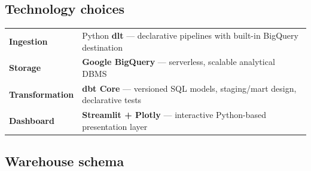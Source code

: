 \documentclass[11pt,a4paper]{article}
\begin{document}
\subsection{Technology choices}

\begin{tcolorbox}[infobox]
\renewcommand{\arraystretch}{1.25}
\begin{tabularx}{\textwidth}{@{}lX@{}}
  \textbf{Ingestion}      & Python \textbf{dlt} --- declarative pipelines with built-in BigQuery destination \\
  \textbf{Storage}        & \textbf{Google BigQuery} --- serverless, scalable analytical DBMS \\
  \textbf{Transformation} & \textbf{dbt Core} --- versioned SQL models, staging/mart design, declarative tests \\
  \textbf{Dashboard}      & \textbf{Streamlit + Plotly} --- interactive Python-based presentation layer \\
\end{tabularx}
\end{tcolorbox}

\subsection{Warehouse schema}
\end{document}

